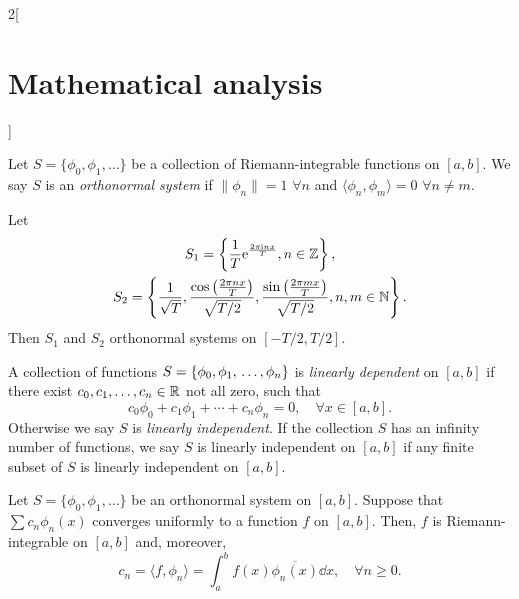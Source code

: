 \documentclass[../../../main.tex]{subfiles}
\begin{document}
\begin{multicols}{2}[\section{Mathematical analysis}]
\begin{definition}
  \end{definition}
  \begin{definition}
    Let $S=\{\phi_0,\phi_1,\ldots\}$ be a collection of Riemann-integrable functions on $[a,b]$. We say $S$ is an \textit{orthonormal system} if $\|\phi_n\|=1$ $\forall n$ and $\langle\phi_n,\phi_m\rangle=0$ $\forall n\ne m$.
  \end{definition}
  \begin{prop}
    Let \begin{gather*}
      S_1=\left\{\frac{1}{T}\mathrm{e}^{\frac{2\pi\mathrm{i} nx}{T}},n\in\mathbb{Z} \right\},\\ S_2=\left\{\frac{1}{\sqrt{T}},\frac{\cos\left(\frac{2\pi nx}{T}\right)}{\sqrt{T/2}},\frac{\sin\left(\frac{2\pi mx}{T}\right)}{\sqrt{T/2}},n,m\in\mathbb{N} \right\}.
    \end{gather*} Then $S_1$ and $S_2$ orthonormal systems on $[-T/2,T/2]$.
  \end{prop}
  \begin{definition}
    A collection of functions $S=\{\phi_0,\phi_1,\\\ldots,\phi_n\}$ is \textit{linearly dependent} on $[a,b]$ if there exist $c_0,c_1,\ldots,c_n\in\mathbb{R} $ not all zero, such that $$c_0\phi_0+c_1\phi_1+\cdots+c_n\phi_n=0,\quad\forall x\in[a,b].$$ Otherwise we say $S$ is \textit{linearly independent}. If the collection $S$ has an infinity number of functions, we say $S$ is linearly independent on $[a,b]$ if any finite subset of $S$ is linearly independent on $[a,b]$.
  \end{definition}
  \begin{theorem}
    Let $S=\{\phi_0,\phi_1,\ldots\}$ be an orthonormal system on $[a,b]$. Suppose that $\sum c_n\phi_n(x)$ converges uniformly to a function $f$ on $[a,b]$. Then, $f$ is Riemann-integrable on $[a,b]$ and, moreover, $$c_n=\langle f,\phi_n\rangle=\int_a^bf(x)\overline{\phi_n(x)}\dd x,\quad\forall n\geq 0.$$
  \end{theorem}

\end{multicols}
\end{document}
